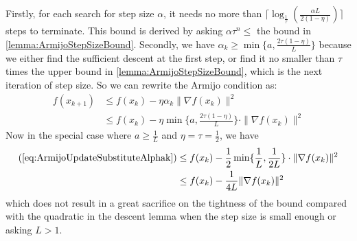 \begin{note}
    Firstly, for each search for step size $\alpha$, it needs no more than $\lceil \log_{\frac{1}{\tau}} (\frac{\alpha L}{2(1-\eta)}) \rceil $ steps to terminate. This bound is derived by asking $\alpha \tau^n \leq $ the bound in \ref{lemma:ArmijoStepSizeBound}. Secondly, we have $\alpha_k \geq \min\{ a, \frac{2\tau(1 - \eta)}{L} \}$ because we either find the sufficient descent at the first step, or find it no smaller than $\tau$ times the upper bound in \ref{lemma:ArmijoStepSizeBound}, which is the next iteration of step size. So we can rewrite the Armijo condition as:
    \begin{align}
        f(x_{k+1}) &\leq f(x_k) - \eta \alpha_k\|\nabla f(x_k) \|^2 \\
        &\leq f(x_k) - \eta \min\{ a, \frac{2\tau(1-\eta)}{L} \} \cdot \|\nabla f(x_k) \|^2  \label{eq:ArmijoUpdateSubstituteAlphak}
    \end{align}
    Now in the special case where $a \geq \frac{1}{L}$ and $\eta = \tau = \frac{1}{2}$, we have 
    \begin{align*}
        (\ref{eq:ArmijoUpdateSubstituteAlphak}) &\leq f(x_k) - \frac{1}{2}\min\{\frac{1}{L}, \frac{1}{2L}\} \cdot \|\nabla f(x_k) \|^2 \\
        &\leq f(x_k) - \frac{1}{4L}\| \nabla f(x_k) \|^2
    \end{align*}
    which does not result in a great sacrifice on the tightness of the bound compared with the quadratic in the descent lemma when the step size is small enough or asking $L > 1$.
\end{note}